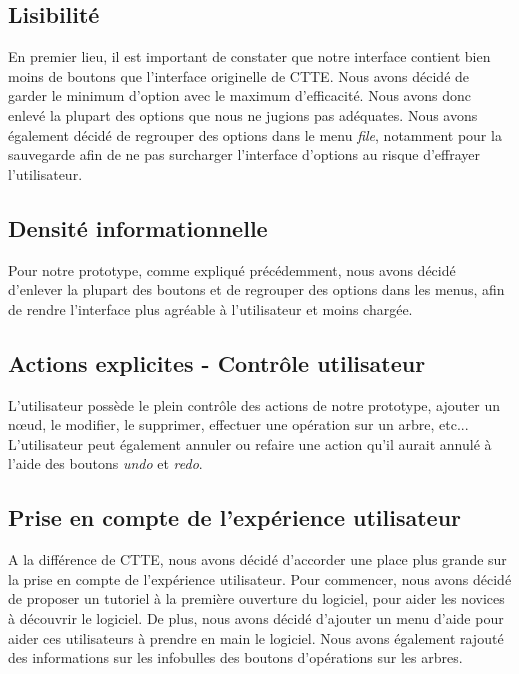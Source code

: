 \documentclass[12pt, a4paper]{article}
\begin{document}
\textcolor{NavyBlue}{\subsection{Lisibilité}}

En premier lieu, il est important de constater que notre interface contient bien moins de boutons que l'interface originelle de CTTE. Nous avons décidé de garder le minimum d'option avec le maximum d'efficacité. Nous avons donc enlevé la plupart des options que nous ne jugions pas adéquates. Nous avons également décidé de regrouper des options dans le menu \emph{file}, notamment pour la sauvegarde afin de ne pas surcharger l'interface d'options au risque d'effrayer l'utilisateur.

\textcolor{NavyBlue}{\subsection{Densité informationnelle}}

Pour notre prototype, comme expliqué précédemment, nous avons décidé d'enlever la plupart des boutons et de regrouper des options dans les menus, afin de rendre l'interface plus agréable à l'utilisateur et moins chargée.

\textcolor{NavyBlue}{\subsection{Actions explicites - Contrôle utilisateur}}

L'utilisateur possède le plein contrôle des actions de notre prototype, ajouter un nœud, le modifier, le supprimer, effectuer une opération sur un arbre, etc... L'utilisateur peut également annuler ou refaire une action qu'il aurait annulé à l'aide des boutons \emph{undo} et \emph{redo}.

\textcolor{NavyBlue}{\subsection{Prise en compte de l'expérience utilisateur}}

A la différence de CTTE, nous avons décidé d'accorder une place plus grande sur la prise en compte de l'expérience utilisateur. Pour commencer, nous avons décidé de proposer un tutoriel à la première ouverture du logiciel, pour aider les novices à découvrir le logiciel. De plus, nous avons décidé d'ajouter un menu d'aide pour aider ces utilisateurs à prendre en main le logiciel. Nous avons également rajouté des informations sur les infobulles des boutons d'opérations sur les arbres.\\
\end{document}
